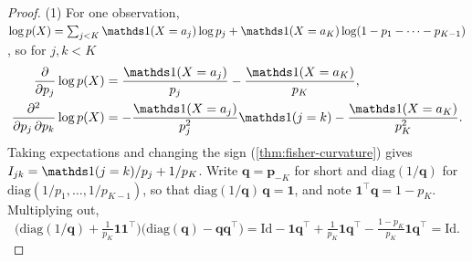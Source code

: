 \begin{proof}
(1) For one observation, $\log p(X) = \sum_{j<K}\ind(X = a_j)\log p_j + \ind(X = a_K)\log(1 - p_1 - \cdots - p_{K-1})$, so for $j, k < K$
\begin{align*}
\frac{\partial}{\partial p_j}\log p(X) &= \frac{\ind(X = a_j)}{p_j} - \frac{\ind(X = a_K)}{p_K}, \\
\frac{\partial^2}{\partial p_j\,\partial p_k}\log p(X) &= -\frac{\ind(X = a_j)}{p_j^2}\ind(j = k) - \frac{\ind(X = a_K)}{p_K^2}.
\end{align*}
Taking expectations and changing the sign (\cref{thm:fisher-curvature}) gives $I_{jk} = \ind(j = k)/p_j + 1/p_K$.
Write $\mathbf{q} = \mathbf{p}_{-K}$ for short and $\mathrm{diag}(1/\mathbf{q})$ for $\mathrm{diag}(1/p_1, \ldots, 1/p_{K-1})$, so that $\mathrm{diag}(1/\mathbf{q})\,\mathbf{q} = \mathbf{1}$, and note $\mathbf{1}^\top\mathbf{q} = 1 - p_K$.
Multiplying out,
\[
\Big(\mathrm{diag}(1/\mathbf{q}) + \tfrac{1}{p_K}\mathbf{1}\mathbf{1}^\top\Big)\big(\mathrm{diag}(\mathbf{q}) - \mathbf{q}\mathbf{q}^\top\big) = \mathrm{Id} - \mathbf{1}\mathbf{q}^\top + \tfrac{1}{p_K}\mathbf{1}\mathbf{q}^\top - \tfrac{1 - p_K}{p_K}\mathbf{1}\mathbf{q}^\top = \mathrm{Id}.
\]


\end{proof}
